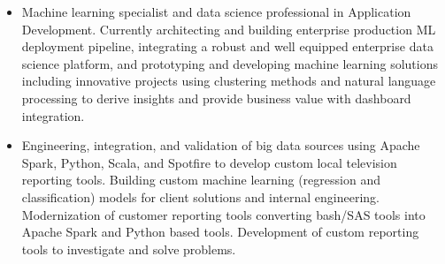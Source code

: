 \documentclass[10pt,a4paper,ragged2e]{altacv}
\begin{document}

\begin{fullwidth}
\makecvheader
\end{fullwidth}




\begin{itemize}
\item Machine learning specialist and data science professional in Application Development. Currently architecting and building enterprise production ML deployment pipeline, integrating a robust and well equipped enterprise data science platform, and prototyping and developing machine learning solutions including innovative projects using clustering methods and natural language processing to derive insights and provide business value with dashboard integration.
\end{itemize}

\divider


\begin{itemize}
\item Engineering, integration, and validation of big data sources using Apache Spark, Python, Scala, and Spotfire to develop custom local television reporting tools. Building custom machine learning (regression and classification) models for client solutions and internal engineering. Modernization of customer reporting tools converting bash/SAS tools into Apache Spark and Python based tools. Development of custom reporting tools to investigate and solve problems.
\end{itemize}
\end{document}

